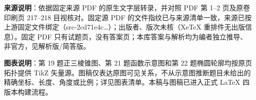 


\begin{gktip}
\textbf{来源说明}：依据固定来源 PDF 的原生文字层转录，并对照 PDF 第 1–2 页及原卷印刷页 217–218 目视核对。固定源 PDF 的文件指纹已与来源清单一致，来源已按上游固定文件绑定（src-2cd71e4c…）；出版者、版次未核（XeTeX 重排件无出版信息）。固定 PDF 只有试题页，没有答案页；本库答案与解析均为编者独立推导、非官方，见解析版/简答版。

\textbf{图表说明}：第 19 题正三棱锥图、第 21 题函数示意图和第 22 题椭圆轮廓均按原页拓扑提供 TikZ 矢量源。图稿仅表达原图可见关系，不从示意图推断题目未给出的精确坐标、长度、角度或比例；详见图表清单。本稿与图稿已进入正式 LaTeX 四版本构建流程。
\end{gktip}


